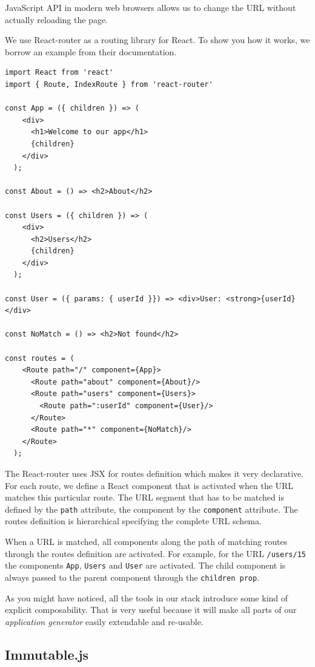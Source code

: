 JavaScript API in modern web browsers allows us to change the URL without actually reloading the page.

We use React-router as a routing library for React. To show you how it works, we borrow an example from their documentation.

\begin{verbatim}
import React from 'react'
import { Route, IndexRoute } from 'react-router'

const App = ({ children }) => (
    <div>
      <h1>Welcome to our app</h1>
      {children}
    </div>
  );

const About = () => <h2>About</h2>

const Users = ({ children }) => (
    <div>
      <h2>Users</h2>
      {children}
    </div>
  );

const User = ({ params: { userId }}) => <div>User: <strong>{userId}</div>

const NoMatch = () => <h2>Not found</h2>

const routes = (
    <Route path="/" component={App}>
      <Route path="about" component={About}/>
      <Route path="users" component={Users}>
        <Route path=":userId" component={User}/>
      </Route>
      <Route path="*" component={NoMatch}/>
    </Route>
  );
\end{verbatim}

The React-router uses JSX for routes definition which makes it very declarative. For each route, we define a React component that is activated when the URL matches this particular route. The URL segment that has to be matched is defined by the \texttt{path} attribute, the component by the \texttt{component} attribute. The routes definition is hierarchical specifying the complete URL schema.

When a URL is matched, all components along the path of matching routes through the routes definition are activated. For example, for the URL \texttt{/users/15} the components \texttt{App}, \texttt{Users} and \texttt{User} are activated. The child component is always passed to the parent component through the \texttt{children prop}. 

As you might have noticed, all the tools in our stack introduce some kind of explicit composability. That is very useful because it will make all parts of our  \emph{application generator} easily extendable and re-usable.

\subsection{Immutable.js}

